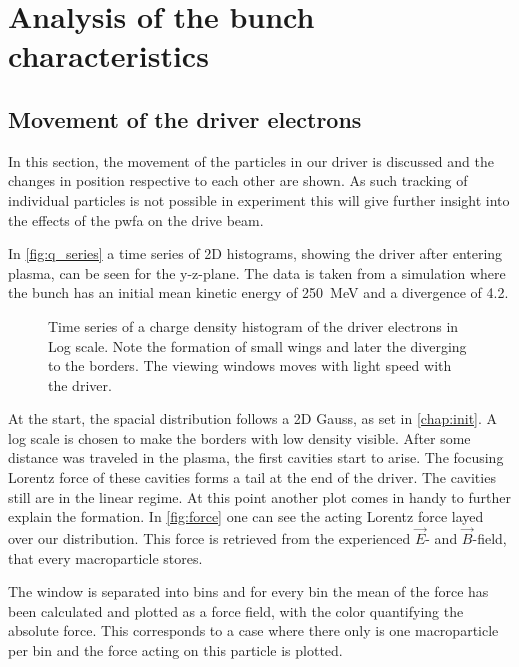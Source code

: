 \documentclass[bachelor_thesis]{subfiles}
\begin{document}
\chapter{Analysis of the bunch characteristics}
\section{Movement of the driver electrons}
In this section, the movement of the particles in our driver is discussed and the changes in position respective to each other are shown. As such tracking of individual particles is not possible in experiment
this will give further insight into the effects of the \gls{pwfa} on the drive beam.

In \autoref{fig:q_series} a time series of 2D histograms, showing the driver after entering plasma, can be seen for the y-z-plane. The data is taken from a simulation where the bunch has an initial mean kinetic energy of \qty{250}{\MeV} and a divergence of \qty{4.2}{\mrad}. 
\begin{figure}
	\centering
	\missingfigure{}
	\caption{Time series of a charge density histogram of the driver electrons in Log scale. Note the formation of small wings and later the diverging to the borders. The viewing windows moves with light speed with the driver.}
	\label{fig:q_series}
\end{figure}
At the start, the spacial distribution follows a 2D Gauss, as set in \autoref{chap:init}. A log scale is chosen to make the borders with low density visible. After some distance was traveled in the plasma, 
the first cavities start to arise. The focusing Lorentz force of these cavities forms a tail at the end of the driver. The cavities still are in the linear regime. At this point another plot comes in handy to further explain the formation.
 In \autoref{fig:force} one can see the acting Lorentz force layed over our distribution. This force is retrieved from the experienced $\vec{E}$- and $\vec{B}$-field, that every macroparticle stores.
\begin{figure}
	\centering
	\missingfigure{}
	\caption{}
	\label{fig:force}
\end{figure}
The window is separated into bins and for every bin the mean of the force has been calculated and plotted as a force field, with the color quantifying the absolute force. This corresponds to a case where there only is one macroparticle per bin and 
the force acting on this particle is plotted.
\end{document}
